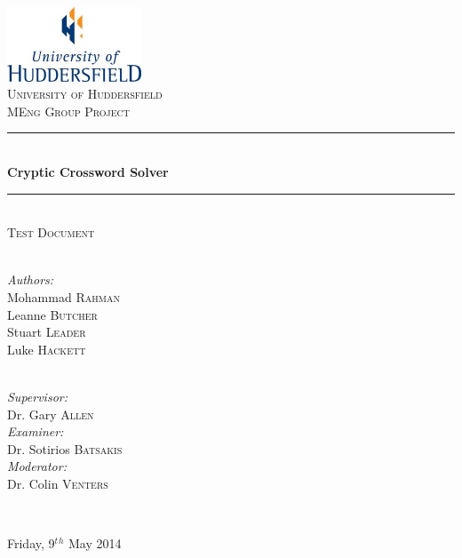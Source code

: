 \newcommand{\HRule}{\rule{\linewidth}{0.5mm}}

\begin{titlepage}
  \begin{center}

  \includegraphics[width=0.3\textwidth]{../UoHLogo.jpg} \\[2.5cm]

  \textsc{\LARGE University of Huddersfield} \\[1.5cm]

  \textsc{\Large MEng Group Project} \\[0.75cm]

  \HRule \\[0.4cm]
    { \huge \bfseries Cryptic Crossword Solver }
  \\[0.1cm]

  \HRule \\[0.75cm]

  \textsc{\Large Test Document} \\[2cm]

  \begin{minipage}{0.4\textwidth}
    \begin{flushleft} \large  ~\\
      \emph{Authors:}          \\[0.5ex]
      Mohammad \textsc{Rahman} \\[0.5ex]
      Leanne \textsc{Butcher}  \\[0.5ex]
      Stuart \textsc{Leader}   \\[0.5ex]
      Luke \textsc{Hackett} 
    \end{flushleft}
  \end{minipage}
  \begin{minipage}{0.4\textwidth}
    \begin{flushright} \large ~\\
      \emph{Supervisor:} \\ 
      Dr. Gary \textsc{Allen}
      ~\\[1ex]
      \emph{Examiner:} \\
      Dr. Sotirios \textsc{Batsakis}
      ~\\[1ex]
      \emph{Moderator:} \\
      Dr. Colin \textsc{Venters} 
    \end{flushright}
  \end{minipage}

  ~\\[0.01cm]


  \vfill

  {\large Friday, 9$^t$$^h$ May 2014}

  \end{center}
\end{titlepage}
